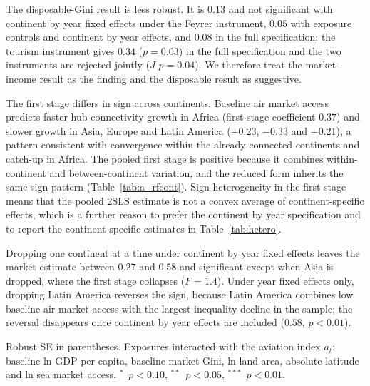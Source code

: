 \documentclass[12pt]{article}
\newcommand{\sym}[1]{\ensuremath{^{#1}}}
\begin{document}
The disposable-Gini result is less robust. It is $0.13$ and not significant with continent by year fixed effects under the Feyrer instrument, $0.05$ with exposure controls and continent by year effects, and $0.08$ in the full specification; the tourism instrument gives $0.34$ ($p=0.03$) in the full specification and the two instruments are rejected jointly ($J$ $p=0.04$). We therefore treat the market-income result as the finding and the disposable result as suggestive.

The first stage differs in sign across continents. Baseline air market access predicts faster hub-connectivity growth in Africa (first-stage coefficient $0.37$) and slower growth in Asia, Europe and Latin America ($-0.23$, $-0.33$ and $-0.21$), a pattern consistent with convergence within the already-connected continents and catch-up in Africa. The pooled first stage is positive because it combines within-continent and between-continent variation, and the reduced form inherits the same sign pattern (Table~\ref{tab:a_rfcont}). Sign heterogeneity in the first stage means that the pooled 2SLS estimate is not a convex average of continent-specific effects, which is a further reason to prefer the continent by year specification and to report the continent-specific estimates in Table~\ref{tab:hetero}.

Dropping one continent at a time under continent by year fixed effects leaves the market estimate between $0.27$ and $0.58$ and significant except when Asia is dropped, where the first stage collapses ($F=1.4$). Under year fixed effects only, dropping Latin America reverses the sign, because Latin America combines low baseline air market access with the largest inequality decline in the sample; the reversal disappears once continent by year effects are included ($0.58$, $p<0.01$).

\begin{table}[H]\centering\caption{Identification diagnostics for the shift-share instruments.}\label{tab:diag}
\begin{threeparttable}\small
\begin{tablenotes}\footnotesize\item Robust SE in parentheses. Exposures interacted with the aviation index $a_t$: baseline ln GDP per capita, baseline market Gini, ln land area, absolute latitude and ln sea market access. \sym{*}~$p<0.10$, \sym{**}~$p<0.05$, \sym{***}~$p<0.01$.\end{tablenotes}\end{threeparttable}\end{table}
\end{document}
